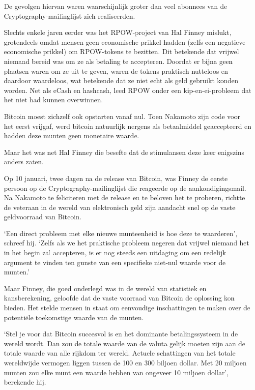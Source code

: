 \documentclass[smalldemyvopaper,11pt,twoside,onecolumn,openright,extrafontsizes,hidelinks]{memoir}
\begin{document}
De gevolgen hiervan waren waarschijnlijk groter dan veel abonnees van de
Cryptography-mailinglijst zich realiseerden.

Slechts enkele jaren eerder was het RPOW-project van Hal Finney mislukt,
grotendeels omdat mensen geen economische prikkel hadden (zelfs een
negatieve economische prikkel) om RPOW-tokens te bezitten. Dit betekende
dat vrijwel niemand bereid was om ze als betaling te accepteren. Doordat
er bijna geen plaatsen waren om ze uit te geven, waren de tokens
praktisch nutteloos en daardoor waardeloos, wat betekende dat ze niet
echt als geld gebruikt konden worden. Net als eCash en hashcash, leed
RPOW onder een kip-en-ei-probleem dat het niet had kunnen overwinnen.

Bitcoin moest zichzelf ook opstarten vanaf nul. Toen Nakamoto zijn code
voor het eerst vrijgaf, werd bitcoin natuurlijk nergens als betaalmiddel
geaccepteerd en hadden deze munten geen monetaire waarde.

Maar het was net Hal Finney die besefte dat de stimulansen deze keer
enigszins anders zaten.

Op 10 januari, twee dagen na de release van Bitcoin, was Finney de
eerste persoon op de Cryptography-mailinglijst die reageerde op de
aankondigingsmail. Na Nakamoto te feliciteren met de release en te
beloven het te proberen, richtte de veteraan in de wereld van
elektronisch geld zijn aandacht snel op de vaste geldvoorraad van
Bitcoin.

`Een direct probleem met elke nieuwe munteenheid is hoe deze te
waarderen', schreef hij. `Zelfs als we het praktische probleem negeren
dat vrijwel niemand het in het begin zal accepteren, is er nog steeds
een uitdaging om een redelijk argument te vinden ten gunste van een
specifieke niet-nul waarde voor de munten.'

Maar Finney, die goed onderlegd was in de wereld van statistiek en
kansberekening, geloofde dat de vaste voorraad van Bitcoin de oplossing
kon bieden. Het stelde mensen in staat om eenvoudige inschattingen te
maken over de potentiële toekomstige waarde van de munten.

`Stel je voor dat Bitcoin succesvol is en het dominante betalingssysteem
in de wereld wordt. Dan zou de totale waarde van de valuta gelijk moeten
zijn aan de totale waarde van alle rijkdom ter wereld. Actuele
schattingen van het totale wereldwijde vermogen liggen tussen de 100 en
300 biljoen dollar. Met 20 miljoen munten zou elke munt een waarde
hebben van ongeveer 10 miljoen dollar', berekende hij.
\end{document}
